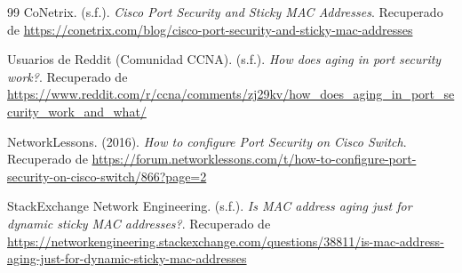 \documentclass[a4paper,12pt]{article}
\begin{document}
\begin{thebibliography}{99}
CoNetrix. (s.f.). \textit{Cisco Port Security and Sticky MAC Addresses}. Recuperado de \url{https://conetrix.com/blog/cisco-port-security-and-sticky-mac-addresses}

Usuarios de Reddit (Comunidad CCNA). (s.f.). \textit{How does aging in port security work?}. Recuperado de \url{https://www.reddit.com/r/ccna/comments/zj29kv/how_does_aging_in_port_security_work_and_what/}

NetworkLessons. (2016). \textit{How to configure Port Security on Cisco Switch}. Recuperado de \url{https://forum.networklessons.com/t/how-to-configure-port-security-on-cisco-switch/866?page=2}

StackExchange Network Engineering. (s.f.). \textit{Is MAC address aging just for dynamic sticky MAC addresses?}. Recuperado de \url{https://networkengineering.stackexchange.com/questions/38811/is-mac-address-aging-just-for-dynamic-sticky-mac-addresses}

\end{thebibliography}
\end{document}
